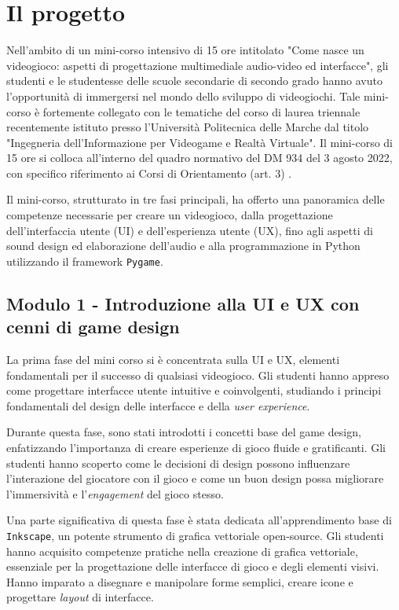 \documentclass{easychair}
\begin{document}
\section{Il progetto}
\label{sec:progetto}

Nell'ambito di un mini-corso intensivo di 15 ore intitolato "Come nasce un videogioco: aspetti di progettazione multimediale audio-video ed interfacce", gli studenti e le studentesse delle scuole secondarie di secondo grado hanno avuto l'opportunità di immergersi nel mondo dello sviluppo di videogiochi. Tale mini-corso è fortemente collegato con le tematiche del corso di laurea triennale recentemente istituto presso l'Università Politecnica delle Marche dal titolo "Ingegneria dell'Informazione per Videogame e Realtà Virtuale". Il mini-corso di 15 ore si colloca all'interno del quadro normativo del DM 934 del 3 agosto 2022, con specifico riferimento ai Corsi di Orientamento (art. 3) \cite{miur}.

Il mini-corso, strutturato in tre fasi principali, ha offerto una panoramica delle competenze necessarie per creare un videogioco, dalla progettazione dell'interfaccia utente (UI) e dell'esperienza utente (UX), fino agli aspetti di sound design ed elaborazione dell'audio e alla programmazione in Python utilizzando il framework \texttt{Pygame}.

\subsection{Modulo 1 -  Introduzione alla UI e UX con cenni di game design}

La prima fase del mini corso si è concentrata sulla UI e UX, elementi fondamentali per il successo di qualsiasi videogioco. Gli studenti hanno appreso come progettare interfacce utente intuitive e coinvolgenti, studiando i principi fondamentali del design delle interfacce e della \textit{user experience}.

Durante questa fase, sono stati introdotti i concetti base del game design, enfatizzando l'importanza di creare esperienze di gioco fluide e gratificanti. Gli studenti hanno scoperto come le decisioni di design possono influenzare l'interazione del giocatore con il gioco e come un buon design possa migliorare l'immersività e l'\textit{engagement} del gioco stesso.

Una parte significativa di questa fase è stata dedicata all'apprendimento base di \texttt{Inkscape}, un potente strumento di grafica vettoriale open-source. Gli studenti hanno acquisito competenze pratiche nella creazione di grafica vettoriale, essenziale per la progettazione delle interfacce di gioco e degli elementi visivi. Hanno imparato a disegnare e manipolare forme semplici, creare icone e progettare \textit{layout} di interfacce.
\end{document}
